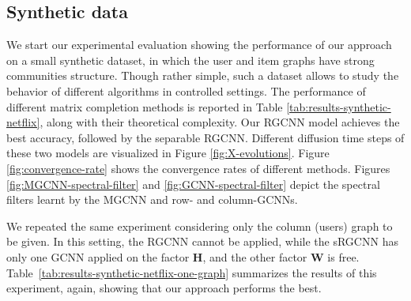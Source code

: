 \documentclass{article}
\begin{document}
\subsection{Synthetic data}
We start our experimental evaluation showing the performance of our approach on a small synthetic dataset, in which the user and item graphs have strong communities structure. Though rather simple, such a dataset allows to study the behavior of different algorithms in controlled settings. 
The performance of different matrix completion methods is reported in Table \ref{tab:results-synthetic-netflix}, along with their theoretical complexity. 
Our RGCNN model achieves the best accuracy, followed by the separable RGCNN. 
Different diffusion time steps of these two models are visualized in Figure \ref{fig:X-evolutions}. 
Figure \ref{fig:convergence-rate} shows the convergence rates of different methods. Figures \ref{fig:MGCNN-spectral-filter} and \ref{fig:GCNN-spectral-filter} depict the spectral filters learnt by the MGCNN and row- and column-GCNNs. 


We repeated the same experiment considering only the column (users) graph to be given. In this setting, the RGCNN cannot be applied, while the sRGCNN has only one GCNN applied on the factor $\mathbf{H}$, and the other factor $\mathbf{W}$ is free. 
Table~\ref{tab:results-synthetic-netflix-one-graph} summarizes the results of this experiment, again, showing that our approach performs the best. 
\end{document}

